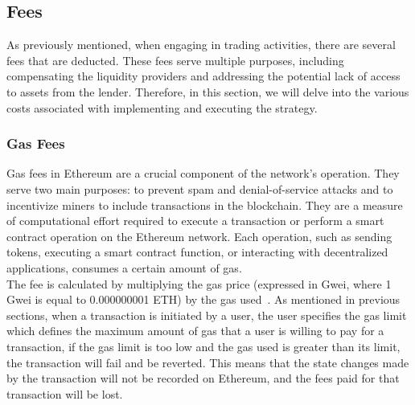\subsection{Fees}
As previously mentioned, when engaging in trading activities, there are several fees that are deducted. These fees serve multiple purposes, including compensating the liquidity providers and addressing the potential lack of access to assets from the lender. Therefore, in this section, we will delve into the various costs associated with implementing and executing the strategy.

\subsubsection{Gas Fees}
Gas fees in Ethereum are a crucial component of the network's operation. They serve two main purposes: to prevent spam and denial-of-service attacks and to incentivize miners to include transactions in the blockchain. They are a measure of computational effort required to execute a transaction or perform a smart contract operation on the Ethereum network. Each operation, such as sending tokens, executing a smart contract function, or interacting with decentralized applications, consumes a certain amount of gas.
\\[5mm]
The fee is calculated by multiplying the gas price (expressed in Gwei, where 1 Gwei is equal to 0.000000001 ETH) by the gas used~\cite{noauthor_gas_nodate}. As mentioned in previous sections, when a transaction is initiated by a user, the user specifies the gas limit which defines the maximum amount of gas that a user is willing to pay for a transaction, if the gas limit is too low and the gas used is greater than its limit, the transaction will fail and be reverted. This means that the state changes made by the transaction will not be recorded on Ethereum, and the fees paid for that transaction will be lost.

